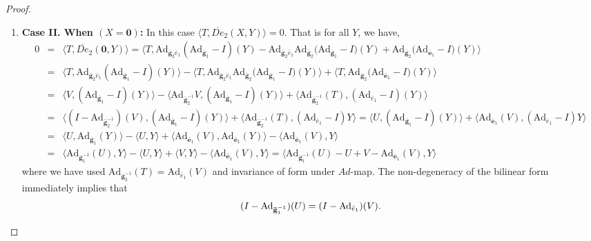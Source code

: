 \documentclass[10pt,twoside]{amsart}
\theoremstyle{definition}
\theoremstyle{definition}
\begin{document}
\begin{proof}
\begin{enumerate}
\item \textbf{Case II. When $(X=\mathbf{0})$:} In  this case $\langle T, \overline{De}_2(X, Y)\rangle = 0$. That is for all $Y$, we have,
\begin{eqnarray*}
0&=& \langle T,\overline{De}_2(\mathbf{0},Y)\rangle = \langle T, \mathrm{Ad}_{\mathbf{\bar g}_2 \bar e_1}\left(\mathrm{Ad}_{\mathbf{\bar g}_1}-I\right)(Y)-\mathrm{Ad}_{\mathbf{\bar g}_2 \bar e_1}\mathrm{Ad}_{\mathbf{\bar g}_2}\Big(\mathrm{Ad}_{\mathbf{\bar g}_1}-I\Big)(Y)+ \mathrm{Ad}_{\mathbf{\bar g}_2}\Big(\mathrm{Ad}_{\mathbf{\bar e}_1}-I\Big)(Y) \rangle \\
&=& \langle T,\mathrm{Ad}_{\mathbf{\bar g}_2 \bar e_1}\left(\mathrm{Ad}_{\mathbf{\bar g}_1}-I\right)(Y)\rangle-\langle T,\mathrm{Ad}_{\mathbf{\bar g}_2 \bar e_1}\mathrm{Ad}_{\mathbf{\bar g}_2}\Big(\mathrm{Ad}_{\mathbf{\bar g}_1}-I\Big)(Y)\rangle +\langle T,\mathrm{Ad}_{\mathbf{\bar g}_2}\Big(\mathrm{Ad}_{\mathbf{\bar e}_1}-I\Big)(Y)\rangle \\
&=& \langle V,\left(\mathrm{Ad}_{\mathbf{\bar g}_1}-I\right)(Y)\rangle-\langle \mathrm{Ad}_{\mathbf{\bar g}_2^{-1}}V,\left(\mathrm{Ad}_{\mathbf{\bar g}_1}-I\right)(Y)\rangle+\langle \mathrm{Ad}_{\mathbf{\bar g}_2^{-1}}(T),\left(\mathrm{Ad}_{\bar e_1}-I\right)(Y)\rangle \\
&=& \langle (I - \mathrm{Ad}_{\mathbf{\bar g}_2^{-1}})(V), (\mathrm{Ad}_{\mathbf{\bar g}_1}-I)(Y)\rangle + \langle \mathrm{Ad}_{\mathbf{\bar g}_2^{-1}}(T),(\mathrm{Ad}_{\bar e_1}-I)Y \rangle 
= \langle U, (\mathrm{Ad}_{\mathbf{\bar g}_1}-I)(Y)\rangle  + \langle \mathrm{Ad}_{\mathbf{\bar e}_1}(V),(\mathrm{Ad}_{\bar e_1}-I) Y \rangle\\
&=& \langle U,\mathrm{Ad}_{\mathbf{\bar g}_1}(Y)\rangle-\langle U,Y\rangle + \langle  \mathrm{Ad}_{\mathbf{\bar e}_1}(V), \mathrm{Ad}_{\mathbf{\bar e}_1}(Y)\rangle-\langle  \mathrm{Ad}_{\mathbf{\bar e}_1}(V),Y\rangle\\
&=&\langle \mathrm{Ad}_{\mathbf{\bar g}_1^{-1}}(U),Y\rangle-\langle U,Y\rangle + \langle V,Y\rangle-\langle  \mathrm{Ad}_{\mathbf{\bar e}_1}(V),Y\rangle = \langle \mathrm{Ad}_{\mathbf{\bar g}_1^{-1}}(U)-U  + V- \mathrm{Ad}_{\mathbf{\bar e}_1}(V), Y\rangle
\end{eqnarray*}
where we have used $\mathrm{Ad}_{\mathbf{\bar g}_2^{-1}}(T) = \mathrm{Ad}_{\bar e_1}(V)$ and invariance of form under $Ad$-map. The non-degeneracy of the bilinear form immediately implies that
\begin{equation}{\label{ortho2}}
(I-\mathrm{Ad}_{\mathbf{\bar g}_1^{-1}})(U)=(I-\mathrm{Ad}_{\bar e_1})(V).
\end{equation}
\end{enumerate}


\end{proof}
\end{document}
